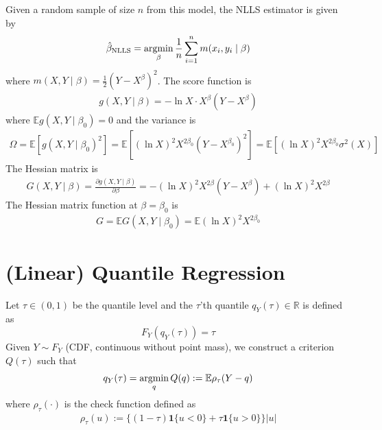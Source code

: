 \documentclass[11pt]{elegantbook}
\newcommand{\argmin}{\operatornamewithlimits{argmin}}
\begin{document}
Given a random sample of size $n$ from this model, the NLLS estimator is given by
\begin{equation}
    \begin{aligned}
        \hat{\beta}_\textnormal{NLLS}=\argmin_\beta \frac{1}{n}\sum_{i=1}^nm(x_i,y_i\mid \beta)
    \end{aligned}
    \nonumber
\end{equation}
where $m(X,Y\mid \beta)=\frac{1}{2}(Y-X^{\beta})^2$. The score function is
\begin{equation}
    \begin{aligned}
        g(X,Y\mid\beta)=-\ln X\cdot X^\beta(Y-X^\beta)
    \end{aligned}
    \nonumber
\end{equation}
where $\mathbb{E}g(X,Y\mid\beta_0)=0$ and the variance is
\begin{equation}
    \begin{aligned}
        \Omega=\mathbb{E}[g(X,Y\mid\beta_0)^2]=\mathbb{E}[(\ln X)^2 X^{2\beta_0}(Y-X^{\beta_0})^2]=\mathbb{E}[(\ln X)^2 X^{2\beta_0}\sigma^2(X)]
    \end{aligned}
    \nonumber
\end{equation}
The Hessian matrix is
\begin{equation}
    \begin{aligned}
        G(X,Y\mid\beta)=\frac{\partial g(X,Y\mid\beta)}{\partial \beta}=-(\ln X)^2 X^{2\beta}(Y-X^\beta)+(\ln X)^2 X^{2\beta}
    \end{aligned}
    \nonumber
\end{equation}
The Hessian matrix function at $\beta=\beta_0$ is
\begin{equation}
    \begin{aligned}
        G=\mathbb{E}G(X,Y\mid\beta_0)=\mathbb{E}(\ln X)^2 X^{2\beta_0}
    \end{aligned}
    \nonumber
\end{equation}

\section{(Linear) Quantile Regression}
Let $\tau\in(0,1)$ be the quantile level and the $\tau$'th quantile $q_Y(\tau)\in \mathbb{R}$ is defined as $$F_Y(q_Y(\tau))=\tau$$
Given $Y\sim F_Y$ (CDF, continuous without point mass), we construct a criterion $Q(\tau)$ such that
\begin{equation}
    \begin{aligned}
        q_Y(\tau)=\argmin_q Q(q):=\mathbb{E}\rho_\tau(Y-q)
    \end{aligned}
    \nonumber
\end{equation}
where $\rho_\tau(\cdot)$ is the check function defined as
\begin{equation}
    \begin{aligned}
        \rho_\tau(u):=\{(1-\tau)\mathbf{1}\{u<0\}+\tau\mathbf{1}\{u>0\}\}|u|
    \end{aligned}
    \nonumber
\end{equation}
\end{document}
